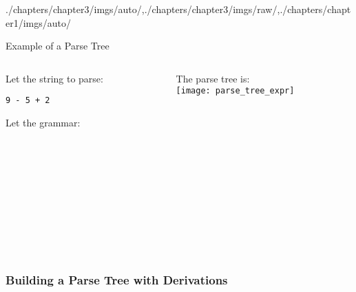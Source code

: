 \begin{graphicspathcontext}{{./chapters/chapter3/imgs/auto/},{./chapters/chapter3/imgs/raw/},{./chapters/chapter1/imgs/auto/}}
\begin{bibunit}[apalike]
\begin{frame}{Example of a Parse Tree}
	\begin{columns}
		\begin{column}[t]{.5\linewidth}
			Let the string to parse:
				\begin{center}\texttt{9 - 5 + 2}\end{center}
			Let the grammar:\\
			\begin{scriptsize}
			\begin{bnf}
				 \\
				 \\
				 \\
				 \\
				 \\
				 \\
				 \\
				 \\
			\end{bnf}
			\end{scriptsize}
		\end{column}
		\begin{column}[t]{.5\linewidth}
			The parse tree is:\\[0.5em]
			\texttt{[image: parse\_tree\_expr]}
		\end{column}			
	\end{columns}
\end{frame}

\subsubsection{Building a Parse Tree with Derivations}
\subsubsectiontableofcontentslide


\end{bibunit}
\end{graphicspathcontext}

